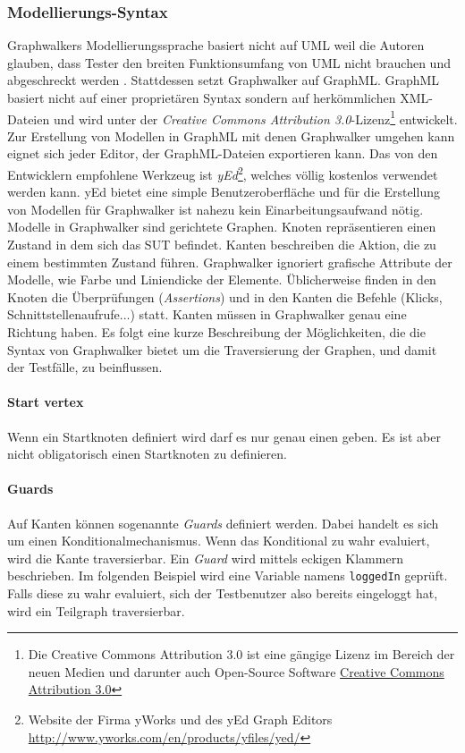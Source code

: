 \subsubsection{Modellierungs-Syntax}
Graphwalkers Modellierungssprache basiert nicht auf UML weil die Autoren glauben, dass Tester den breiten Funktionsumfang von \Gls{UML} nicht brauchen und abgeschreckt werden \cite{_graphwalker_2015}. Stattdessen setzt Graphwalker auf GraphML. GraphML basiert nicht auf einer proprietären Syntax sondern auf herkömmlichen XML-Dateien und wird unter der \textit{Creative Commons Attribution 3.0}-Lizenz\footnote{Die Creative Commons Attribution 3.0 ist eine gängige Lizenz im Bereich der neuen Medien und darunter auch Open-Source Software \url{Creative Commons Attribution 3.0}} entwickelt.\\
Zur Erstellung von Modellen in GraphML mit denen Graphwalker umgehen kann eignet sich jeder Editor, der GraphML-Dateien exportieren kann. Das von den Entwicklern empfohlene Werkzeug ist \textit{yEd}\footnote{Website der Firma yWorks und des yEd Graph Editors \url{http://www.yworks.com/en/products/yfiles/yed/}}, welches völlig kostenlos verwendet werden kann. yEd bietet eine simple Benutzer\-ober\-fläche und für die Erstellung von Modellen für Graphwalker ist nahezu kein Einarbeitungsaufwand nötig.\\
Modelle in Graphwalker sind gerichtete Graphen. Knoten repräsentieren einen Zustand in dem sich das \Gls{SUT} befindet. Kanten beschreiben die Aktion, die zu einem bestimmten Zustand führen. Graphwalker ignoriert grafische Attribute der Modelle, wie Farbe und Liniendicke der Elemente. Üblicherweise finden in den Knoten die Überprüfungen (\textit{Assertions}) und in den Kanten die Befehle (Klicks, Schnittstellenaufrufe...) statt. Kanten müssen in Graphwalker genau eine Richtung haben. Es folgt eine kurze Beschreibung der Möglichkeiten, die die Syntax von Graphwalker bietet um die Traversierung der Graphen, und damit der Testfälle, zu beinflussen.

\paragraph{Start vertex} Wenn ein Startknoten definiert wird darf es nur genau einen geben. Es ist aber nicht obligatorisch einen Startknoten zu definieren.

\paragraph{Guards} Auf Kanten können sogenannte \textit{Guards} definiert werden. Dabei handelt es sich um einen Konditionalmechanismus. Wenn das Konditional zu wahr evaluiert, wird die Kante traversierbar. Ein \textit{Guard} wird mittels eckigen Klammern beschrieben. Im folgenden Beispiel wird eine Variable namens \texttt{loggedIn} geprüft. Falls diese zu wahr evaluiert, sich der Testbenutzer also bereits eingeloggt hat, wird ein Teilgraph traversierbar.

